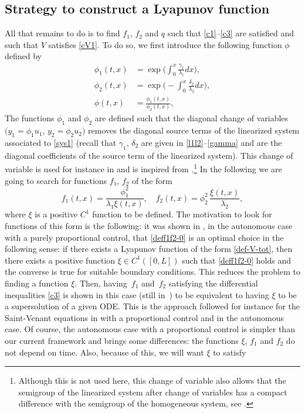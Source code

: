 \documentclass[11pt]{article}
\numberwithin{equation}{section}
\theoremstyle{definition}
\begin{document}
\subsection{Strategy to construct a Lyapunov function}
{A}ll that remains to do is to find $f_{1}$, $f_{2}$ and $q$ such that \eqref{c1}--\eqref{c3} are satisfied and such that $V$ satisfies \eqref{cV1}.
{To do so, we} first introduce the following function $\phi$ defined by
\begin{equation}
\begin{split}
\phi_{1}(t,x)&=\exp\biggl(\int_{0}^{x}\frac{\gamma_{1}}{\lambda_{1}}dx\biggr),\\
\phi_{2}(t,x)&=\exp\biggl(-\int_{0}^{x}\frac{\delta_{2}}{\lambda_{2}}dx\biggr),\\
\phi(t,x)&=\frac{\phi_{1}(t,x)}{\phi_{2}(t,x)},
\end{split}
\label{phi}
\end{equation}
The functions $\phi_{1}$ and $\phi_{2}$ are defined such that the diagonal change of variables $(y_{1} = \phi_{1}u_{1}$, $y_{2}= \phi_{2}u_{2})$ removes the diagonal source terms of the linearized system associated to \eqref{sys1} (recall that $\gamma_{1}$, $\delta_{2}$ are given in \eqref{l1l2}--\eqref{gamma} and are the diagonal coefficients of the source term of the linearized system). This change of variable is used for instance in \cite{BastinCoron22,C1_22} and is inspired from \cite[Chap.\,9]{KrsticBook}.\footnote{Although this is not used here, this change of variable also allows that the semigroup of the linearized system after change of variables has a compact difference with the semigroup of the homogeneous system, see \cite{hu2021minimal}.} In the following we are going to search for functions $f_{1}$, $f_{2}$ of the form
\begin{equation}
f_{1}(t,x)=\frac{\phi^{2}_{1}}{\lambda_{1}\xi(t,x)},\quad f_{2}(t,x)=\phi_{2}^{2}\,\frac{\xi(t,x)}{\lambda_{2}},
\label{deff1f2-0}
\end{equation}
where $\xi$ is a positive $C^{1}$ function to be defined. The motivation to look for functions of this form is the following: it was shown in \cite{BastinCoron22}, in the autonomous case with a purely proportional control, that \eqref{deff1f2-0} is an optimal choice in the following sense: if there exists a Lyapunov function of the form \eqref{def-V-tot}, then there exists a positive function $\xi\in C^{1}([0,L])$ such that \eqref{deff1f2-0} holds and the converse is true for suitable boundary conditions. This reduces the problem to finding a function $\xi$. Then, having~$f_{1}$ and~$f_{2}$ satisfying the differential inequalities \eqref{c3} is shown in this case (still in~\cite{BastinCoron22}) to be equivalent to having $\xi$ to be a supersolution of a given ODE. This is the approach followed for instance for the Saint-Venant equations in \cite{BC2017,HS} with a proportional control and in the autonomous case. Of course, the autonomous case with a proportional control is simpler than our current framework and brings some differences: the functions $\xi$, $f_{1}$ and $f_{2}$ do not depend on time. Also, because of this, we will want $\xi$ to satisfy
\end{document}
